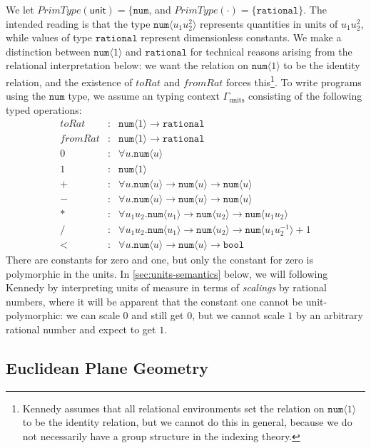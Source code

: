 \documentclass[natbib,preprint]{sigplanconf}
\newcommand{\tyBool}{\texttt{bool}}
\newcommand{\tyPrim}[2]{\texttt{#1}\langle #2 \rangle}
\newcommand{\tyPrimNm}[1]{\texttt{#1}}
\begin{document}
We let $\mathit{PrimType}(\mathsf{unit}) = \{\tyPrimNm{num}$, and
$\mathit{PrimType}(\cdot) = \{\tyPrimNm{rational}\}$. The intended
reading is that the type $\tyPrim{num}{u_1u^2_2}$ represents
quantities in units of $u_1u^2_2$, while values of type
$\tyPrimNm{rational}$ represent dimensionless constants. We make a
distinction between $\tyPrim{num}{1}$ and $\tyPrimNm{rational}$ for
technical reasons arising from the relational interpretation below: we
want the relation on $\tyPrim{num}{1}$ to be the identity relation,
and the existence of $\mathit{toRat}$ and $\mathit{fromRat}$ forces
this\footnote{Kennedy assumes that all relational environments set the
  relation on $\tyPrim{num}{1}$ to be the identity relation, but we
  cannot do this in general, because we do not necessarily have a
  group structure in the indexing theory.}. To write programs using
the $\tyPrimNm{num}$ type, we assume an typing context
$\Gamma_{\textrm{units}}$ consisting of the following typed
operations:
\begin{eqnarray*}
  \mathit{toRat} & : & \tyPrim{num}{1} \to \tyPrimNm{rational} \\
  \mathit{fromRat} & : & \tyPrim{num}{1} \to \tyPrimNm{rational} \\
  0 & : & \forall u. \tyPrim{num}{u} \\
  1 & : & \tyPrim{num}{1} \\
  + & : & \forall u. \tyPrim{num}{u} \to \tyPrim{num}{u} \to \tyPrim{num}{u} \\
  - & : & \forall u. \tyPrim{num}{u} \to \tyPrim{num}{u} \to \tyPrim{num}{u} \\
  * & : & \forall u_1 u_2. \tyPrim{num}{u_1} \to \tyPrim{num}{u_2} \to \tyPrim{num}{u_1u_2} \\
  / & : & \forall u_1 u_2. \tyPrim{num}{u_1} \to \tyPrim{num}{u_2} \to \tyPrim{num}{u_1u_2^{-1}} + 1 \\
  < & : & \forall u. \tyPrim{num}{u} \to \tyPrim{num}{u} \to \tyBool
\end{eqnarray*}
There are constants for zero and one, but only the constant for zero
is polymorphic in the units. In \autoref{sec:units-semantics} below,
we will following Kennedy by interpreting units of measure in terms of
\emph{scalings} by rational numbers, where it will be apparent that
the constant one cannot be unit-polymorphic: we can scale $0$ and
still get $0$, but we cannot scale $1$ by an arbitrary rational number
and expect to get $1$.

\subsection{Euclidean Plane Geometry}\label{sec:2d-example}
\end{document}
